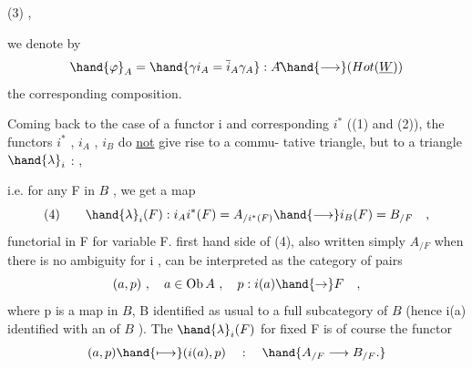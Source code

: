 
(3) \hfill ,

we denote by
\[ \hand{\varphi}_A= \hand{\gamma i_A = \overline{i}_A\gamma_A} : A\hat{} \hand{\longrightarrow} (Hot(\underline{W})) \]
the corresponding composition.

Coming back to the case of a functor i and corresponding $i^*$
((1) and (2)), the functors $i^*$ , $i_A$ , $i_B$ do \uline{not} give rise to a commu-%
tative triangle, but to a triangle \hand{\uline{\textcolor{black}{with commutation morphism}}} $\hand{\lambda}_i$ :
\hfill ,

i.e. for any F in $B\hat{}$ , we get a map 
\[ (4) \qquad \hand{\lambda}_i(F) : i_Ai^*(F) = A_{/i^{*}(F)} \hand{\longrightarrow} i_B(F) = B_{/F} \quad , \]
functorial in F for variable F.  first hand side of (4), also
written simply $A_{/F}$ when there is no ambiguity for i ,  can be
interpreted as the category of pairs
\[ (a,p) \ , \quad a \in \mathrm{Ob}\, A \ , \quad p: i(a) \hand{\to} F \quad , \]
where p is a map in $B\hat{}$, B identified as usual to a full subcategory of
$B\hat{}$ (hence i(a) identified with an  of $B\hat{}$ ). The   $\hand{\lambda}_i(F)$
for fixed F is of course the  functor
\[ (a,p) \hand{\longmapsto} (i(a),p) \quad : \quad \hand{A_{/F} \longrightarrow B_{/F} .} \]

